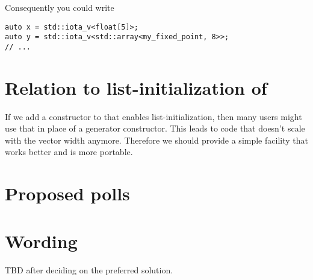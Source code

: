 Consequently you could write
\medskip\begin{lstlisting}[style=Vc]
auto x = std::iota_v<float[5]>;
auto y = std::iota_v<std::array<my_fixed_point, 8>>;
// ...
\end{lstlisting}

\section{Relation to list-initialization of }
If we add a constructor to \simd that enables list-initialization, then many
users might use that in place of a generator constructor.
This leads to code that doesn't scale with the vector width anymore.
Therefore we should provide a simple facility that works better and is more
portable.

\section{Proposed polls}




\section{Wording}\label{sec:wording}

TBD after deciding on the preferred solution.


